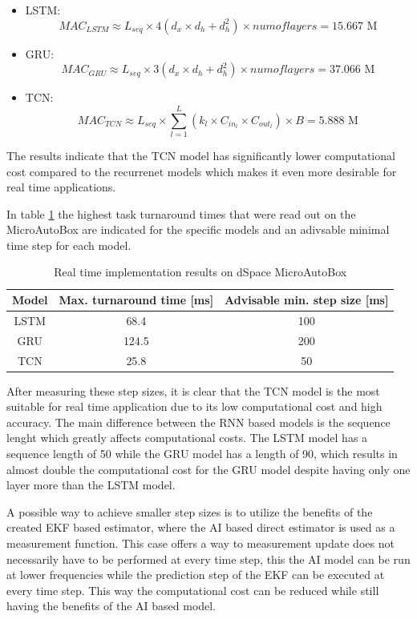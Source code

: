 \begin{itemize}
    \item LSTM:
    \begin{equation}
        MAC_{LSTM} \approx L_{seq} \times  4(d_x \times d_h + d_h^2) \times {num of layers} = 15.667 \text{ M}
    \end{equation}
    \item GRU:
    \begin{equation}
        MAC_{GRU} \approx L_{seq} \times  3(d_x \times d_h + d_h^2) \times {num of layers} = 37.066 \text{ M}
    \end{equation}
    \item TCN:
    \begin{equation}
        MAC_{TCN} \approx L_{seq} \times \sum_{l=1}^{L} (k_l \times C_{in_l} \times C_{out_l}) \times B  = 5.888 \text{ M}
    \end{equation}
\end{itemize}

The results indicate that the TCN model has significantly lower computational cost compared to the recurrenet models which makes it even more desirable for real time applications.

In table \ref{tab:rt_comparison} the highest task turnaround times that were read out on the MicroAutoBox are indicated for the specific models and an adivsable minimal time step for each model.

\begin{table}[h]
    \centering
    \begin{tabular}{|c|c|c|}
        \hline
        \textbf{Model} & \textbf{Max. turnaround time [ms]} & \textbf{Advisable min. step size [ms]} \\
        \hline \hline
        LSTM & 68.4 & 100 \\
        \hline
        GRU & 124.5 & 200 \\
        \hline
        TCN & 25.8 & 50 \\
        \hline
    \end{tabular}
    \caption{Real time implementation results on dSpace MicroAutoBox}
    \label{tab:rt_comparison}
\end{table}

After measuring these step sizes, it is clear that the TCN model is the most suitable for real time application due to its low computational cost and high accuracy. The main difference between the RNN based models is the sequence lenght which greatly affects computational costs. The LSTM model has a sequence length of 50 while the GRU model has a length of 90, which results in almost double the computational cost for the GRU model despite having only one layer more than the LSTM model.

A possible way to achieve smaller step sizes is to utilize the benefits of the created EKF based estimator, where the AI based direct estimator is used as a measurement function. This case offers a way to measurement update does not necessarily have to be performed at every time step, this the AI model can be run at lower frequencies while the prediction step of the EKF can be executed at every time step. This way the computational cost can be reduced while still having the benefits of the AI based model.